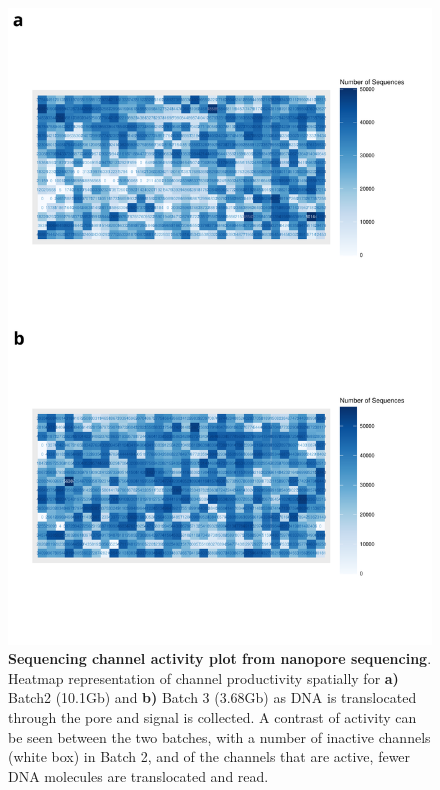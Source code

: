 \begin{figure}[htp]
	\begin{center}
		\includegraphics[page=1,trim={0 4cm 0 0},scale = 0.45]{Figures/ONTTargetedTranscriptome.pdf}
	\end{center}
	\captionsetup{width=0.95\textwidth}
	\caption[ONT Sequence Channel Activity from Whole Transcriptome Sequencing ]%
	{\textbf{Sequencing channel activity plot from nanopore sequencing}. Heatmap representation of channel productivity spatially for \textbf{a)} Batch2 (10.1Gb) and \textbf{b)} Batch 3 (3.68Gb) as DNA is translocated through the pore and signal is collected. A contrast of activity can be seen between the two batches, with a number of inactive channels (white box) in Batch 2, and of the channels that are active, fewer DNA molecules are translocated and read.}
	\label{fig:ont_targetedseq_channel}
\end{figure}

